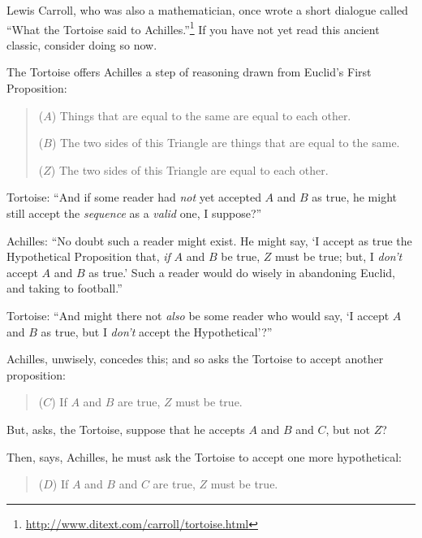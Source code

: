 \myendsectiontext


\bigskip



 Lewis Carroll, who was also a mathematician, once wrote a short
dialogue called ``What the Tortoise said to
Achilles.''\footnote{\url{http://www.ditext.com/carroll/tortoise.html}} If you have not yet read this ancient
classic, consider doing so now. 


 The Tortoise offers Achilles a step of reasoning drawn from
Euclid's First Proposition:

\begin{quotation}

 ($A$) Things that are equal to the same are equal to each other.


 ($B$) The two sides of this Triangle are things that are equal to
the same.

{
  ($Z$) The two sides of this Triangle are equal to each other.}
\end{quotation}


 Tortoise: ``And if some reader had \textit{not}
yet accepted $A$ and $B$ as true, he might still accept the
\textit{sequence} as a \textit{valid} one, I
suppose?''


 Achilles: ``No doubt such a reader might exist.
He might say, `I accept as true the Hypothetical
Proposition that, \textit{if} $A$ and $B$ be true, $Z$ must be true; but, I
\textit{don't} accept $A$ and $B$ as true.'
Such a reader would do wisely in abandoning Euclid, and taking to
football.''


 Tortoise: ``And might there not \textit{also} be
some reader who would say, `I accept $A$ and $B$ as true,
but I \textit{don't} accept the
Hypothetical'?''


 Achilles, unwisely, concedes this; and so asks the Tortoise to
accept another proposition:

\begin{quotation}
{
  ($C$) If $A$ and $B$ are true, $Z$ must be true.}
\end{quotation}


 But, asks, the Tortoise, suppose that he accepts $A$ and $B$ and $C$,
but not $Z$?


 Then, says, Achilles, he must ask the Tortoise to accept one more
hypothetical:

\begin{quotation}
{
  ($D$) If $A$ and $B$ and $C$ are true, $Z$ must be true.}
\end{quotation}


